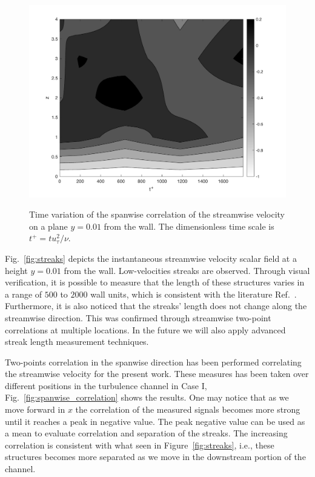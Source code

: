 \documentclass[twocolumn,10pt]{asme2e}
\begin{document}
\begin{figure}[t]
\centering
\scalebox{0.5}
{\includegraphics{time_spanwise_correlation.pdf}}
\caption{Time variation of the spanwise correlation of the streamwise velocity on a plane \(y=0.01\) from the wall. The dimensionless time scale is \(t^+=tu_{\tau}^2/{\nu}\).}
\label{fig:contour_map}
\end{figure}

Fig.~\ref{fig:streaks} depicts the  instantaneous streamwise velocity scalar field at a height \(y=0.01\) from the wall. Low-velocities streaks are observed. Through visual verification, it is possible to measure that the length of these structures varies in a range of \(500\) to \(2000\) wall units, which is consistent with the literature Ref.~\cite{carlier2005}. Furthermore, it is also noticed that the streaks' length does not change along the streamwise direction. This was confirmed through streamwise two-point correlations at multiple locations. In the future we will also apply advanced streak length measurement techniques.

Two-points correlation in the spanwise direction has been performed correlating the streamwise velocity for the present work. These measures has been taken over different positions in the turbulence channel in Case I, Fig.~\ref{fig:spanwise_correlation} shows the results. One may notice that as we move forward in \(x\) the correlation of the measured signals becomes more strong until it reaches a peak in negative value. The peak negative value can be used as a mean to evaluate correlation and separation of the streaks.  The increasing correlation is consistent with what seen  in Figure~\ref{fig:streaks}, i.e., these structures becomes more separated as we move in the downstream portion of the channel.
\end{document}
